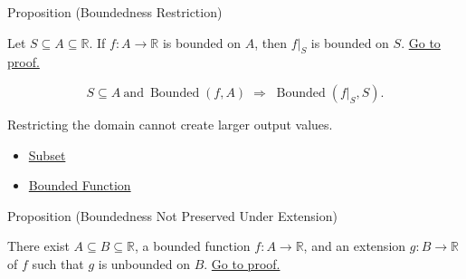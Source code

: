 \begin{propositionbox}{Proposition (Boundedness Restriction)}
\begin{proposition}
\label{prop:boundedness-restriction}
Let \(S\subseteq A\subseteq\mathbb{R}\).  If \(f:A\to\mathbb{R}\) is
bounded on \(A\), then \(f|_S\) is bounded on \(S\).
\hyperref[prf:boundedness-restriction]{Go to proof.}
\end{proposition}
\end{propositionbox}

\begin{remark*}
\[
  S\subseteq A\ \text{and}\ \operatorname{Bounded}(f,A)
  \;\Longrightarrow\;
  \operatorname{Bounded}(f|_S,S).
\]
\end{remark*}

\begin{remark*}[Interpretation]
Restricting the domain cannot create larger output values.
\end{remark*}

\begin{dependencies}
\begin{itemize}
  \item \hyperref[def:subset]{Subset}
  \item \hyperref[def:function-bounded]{Bounded Function}
\end{itemize}
\end{dependencies}

\begin{propositionbox}{Proposition (Boundedness Not Preserved Under Extension)}
\begin{proposition}
\label{prop:boundedness-not-preserved-under-extension}
There exist \(A\subseteq B\subseteq\mathbb{R}\), a bounded function
\(f:A\to\mathbb{R}\), and an extension \(g:B\to\mathbb{R}\) of \(f\) such
that \(g\) is unbounded on \(B\).
\hyperref[prf:boundedness-not-preserved-under-extension]{Go to proof.}
\end{proposition}
\end{propositionbox}

